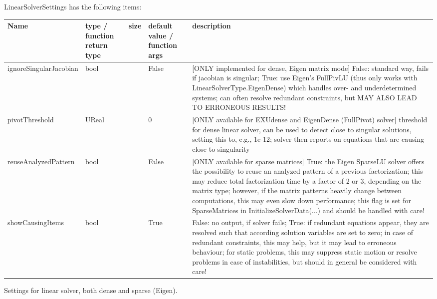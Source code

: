 \noindent LinearSolverSettings has the following items:
\begin{center}
  \footnotesize
  \begin{longtable}{| p{4.2cm} | p{2.5cm} | p{0.3cm} | p{3.0cm} | p{6cm} |}
    \hline
    \bf Name & \bf type / function return type & \bf size & \bf default value / function args & \bf description \\ \hline
    ignoreSingularJacobian &     bool &      &     False &     [ONLY implemented for dense, Eigen matrix mode] False: standard way, fails if jacobian is singular; True: use Eigen's FullPivLU (thus only works with LinearSolverType.EigenDense) which handles over- and underdetermined systems; can often resolve redundant constraints, but MAY ALSO LEAD TO ERRONEOUS RESULTS!\\ \hline
    pivotThreshold &     UReal &      &     0 &     [ONLY available for EXUdense and EigenDense (FullPivot) solver] threshold for dense linear solver, can be used to detect close to singular solutions, setting this to, e.g., 1e-12; solver then reports on equations that are causing close to singularity\\ \hline
    reuseAnalyzedPattern &     bool &      &     False &     [ONLY available for sparse matrices] True: the Eigen SparseLU solver offers the possibility to reuse an analyzed pattern of a previous factorization; this may reduce total factorization time by a factor of 2 or 3, depending on the matrix type; however, if the matrix patterns heavily change between computations, this may even slow down performance; this flag is set for SparseMatrices in InitializeSolverData(...) and should be handled with care!\\ \hline
    showCausingItems &     bool &      &     True &     False: no output, if solver fails; True: if redundant equations appear, they are resolved such that according solution variables are set to zero; in case of redundant constraints, this may help, but it may lead to erroneous behaviour; for static problems, this may suppress static motion or resolve problems in case of instabilities, but should in general be considered with care!\\ \hline
	  \end{longtable}
	\end{center}



\label{sec:Parallel}
Settings for linear solver, both dense and sparse (Eigen).

